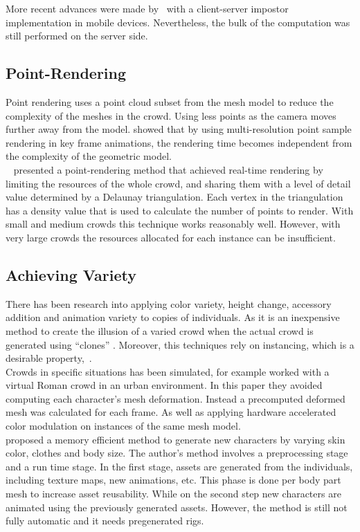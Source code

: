 \documentclass[6pt]{article} %
\begin{document}
\begin{multicols}{2}
More recent advances were made by~\cite{Ghiletiuc2013} with a client-server impostor implementation in mobile devices.
Nevertheless, the bulk of the computation was still performed on the server side.

\subsection{Point-Rendering}

Point rendering uses a point cloud subset from the mesh model to reduce the complexity of the meshes in the crowd.
Using less points as the camera moves further away from the model.
\cite{Wand2002} showed that by using multi-resolution point sample rendering in key frame animations, the rendering time becomes independent from the complexity of the geometric model.\\

~\cite{Larkin2010} presented a point-rendering method that achieved real-time rendering by limiting the resources of the whole crowd, and sharing them with a level of detail value determined by a Delaunay triangulation. 
Each vertex in the triangulation has a density value that is used to calculate the number of points to render.
With small and medium crowds this technique works reasonably well.
However, with very large crowds the resources allocated for each instance can be insufficient.

\subsection{Achieving Variety}

There has been research into applying color variety, height change, accessory addition and animation variety to copies of individuals.
As it is an inexpensive method to create the illusion of a varied crowd when the actual crowd is generated using ``clones'' .
Moreover, this techniques rely on instancing, which is a desirable property,~\cite{zelsnack2004glsl}.\\

Crowds in specific situations has been simulated, for example \cite{deHeras2005} worked with a virtual Roman crowd in an urban environment.
In this paper they avoided computing each character’s mesh deformation.
Instead a precomputed deformed mesh was calculated for each frame. 
As well as applying hardware accelerated color modulation on instances of the same mesh model.\\

\cite{ruiz2013} proposed a memory efficient method to generate new characters by varying skin color, clothes and body size.
The author's method involves a preprocessing stage and a run time stage.
In the first stage, assets are generated from the individuals, including texture maps, new animations, etc.
This phase is done per body part mesh to increase asset reusability.
While on the second step new characters are animated using the previously generated assets.
However, the method is still not fully automatic and it needs pregenerated rigs.


\end{multicols}
\end{document}
